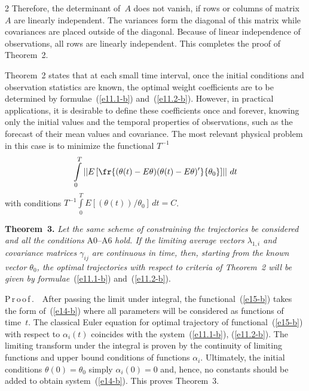 \begin{multicols}{2}
Therefore, the determinant of~$A$ does not vanish, if rows or columns of matrix~$A$ 
are linearly independent. The variances form the diagonal of this matrix while 
covariances are placed outside of the diagonal. Because of linear independence 
of observations, all rows are linearly independent. This completes the proof of Theorem~2.

Theorem~2 states that at each small time interval, once the initial conditions and observation 
statistics are known, the optimal weight coefficients are to be determined by 
formulae~(\ref{e11.1-b}) and~(\ref{e11.2-b}). 
However, in practical applications, it is desirable to define these coefficients once and 
forever, knowing only the initial values and the temporal properties of observations, such 
as the forecast of their mean values and covariance. The most relevant physical problem in 
this case is to minimize the functional  $T^{-1}$
\begin{equation}
\int\limits_{0}^{T} \left\vert\left\vert E
\left[\fr{(\theta (t)-E\theta )(\theta (t)-E\theta )'}{\theta_{0}} \right]\right\vert\right\vert \,dt  
\label{e15-b}
\end{equation}
with conditions $T^{-1} \int\limits_{0}^{T} E\left[(\theta (t))^{} /\theta_{0} \right]\,dt=C $.

\medskip

\noindent 
\textbf{Theorem~3.}
\textit{Let the same scheme of constraining the trajectories be considered and all the 
conditions} A0--A6 \textit{hold. If the limiting average vectors $\lambda_{1,i} $ and 
covariance matrices $\gamma_{ij} $ are continuous in time, then, starting from 
the known vector $\theta_{0} $, the optimal trajectories with respect to criteria 
of Theorem~2 will be given by formulae}~(\ref{e11.1-b}) and~(\ref{e11.2-b}).

\medskip


\noindent 
P\,r\,o\,o\,f\,.\ \ 
After passing the limit under integral,
 the functional~(\ref{e15-b}) takes the form of~(\ref{e14-b}) 
where all parameters will be considered as functions of time~$t$. The classical Euler 
equation for optimal trajectory of functional~(\ref{e15-b}) with respect to $\alpha_{i}(t)$ 
coincides with the system~(\ref{e11.1-b}), (\ref{e11.2-b}).  The limiting transform 
under the integral is proven by the continuity of limiting functions and upper bound conditions of functions $\alpha_{i}$. 
Ultimately, the initial conditions $\theta (0)=\theta_{0} $ simply $\alpha_{i} (0)=0$ 
and, hence, no constants should be added to obtain system~(\ref{e14-b}). This proves Theorem~3.


\end{multicols}
